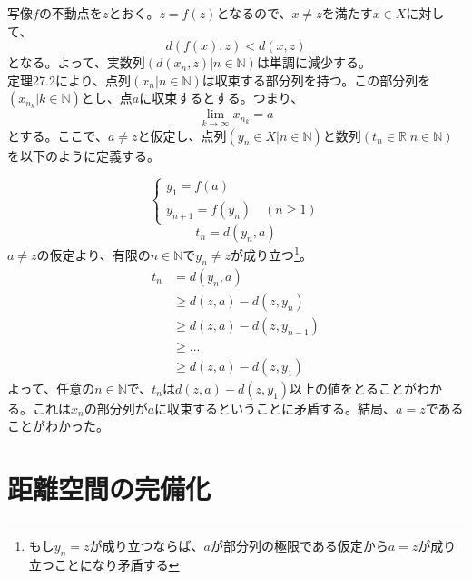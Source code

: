 \documentclass{jsarticle}
\begin{document}
\subsubsection{}
写像$f$の不動点を$z$とおく。$z=f(z)$となるので、$x\neq z$を満たす$x\in X$に対して、
\[d(f(x),z)<d(x,z)\]
となる。よって、実数列$(d(x_n,z)|n\in\mathbb{N})$は単調に減少する。\\
定理27.2により、点列$(x_n | n\in\mathbb{N})$は収束する部分列を持つ。この部分列を$(x_{n_k}|k\in\mathbb{N})$とし、点$a$に収束するとする。つまり、
\[\lim_{k\to\infty}x_{n_k}=a\]
とする。ここで、$a\neq z$と仮定し、点列$(y_n\in X|n\in\mathbb{N})$と数列$(t_n\in \mathbb{R}|n\in\mathbb{N})$を以下のように定義する。

\[
\begin{cases}
y_1=f(a)\\
y_{n+1}=f(y_n)\quad(n\geq 1)
\end{cases}
\]
\[
t_n=d(y_n,a)
\]
$a\neq z$の仮定より、有限の$n\in\mathbb{N}$で$y_{n}\neq z$が成り立つ\footnote{もし$y_n=z$が成り立つならば、$a$が部分列の極限である仮定から$a=z$が成り立つことになり矛盾する}。
\begin{align*}
t_{n}&=d(y_n,a)\\
&\geq d(z,a)-d(z,y_n)\\
&\geq d(z,a)-d(z,y_{n-1})\\
&\geq ...\\
&\geq d(z,a)-d(z,y_1)
\end{align*}
よって、任意の$n\in\mathbb{N}$で、$t_n$は$d(z,a)-d(z,y_1)$以上の値をとることがわかる。これは$x_n$の部分列が$a$に収束するということに矛盾する。結局、$a=z$であることがわかった。







\section{距離空間の完備化}


\end{document}
